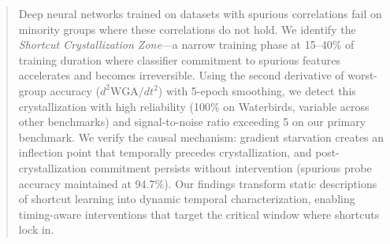 \begin{abstract}
Deep neural networks trained on datasets with spurious correlations fail on minority groups where these correlations do not hold. We identify the \emph{Shortcut Crystallization Zone}---a narrow training phase at 15--40\% of training duration where classifier commitment to spurious features accelerates and becomes irreversible. Using the second derivative of worst-group accuracy ($d^2\text{WGA}/dt^2$) with 5-epoch smoothing, we detect this crystallization with high reliability (100\% on Waterbirds, variable across other benchmarks) and signal-to-noise ratio exceeding 5 on our primary benchmark. We verify the causal mechanism: gradient starvation creates an inflection point that temporally precedes crystallization, and post-crystallization commitment persists without intervention (spurious probe accuracy maintained at 94.7\%). Our findings transform static descriptions of shortcut learning into dynamic temporal characterization, enabling timing-aware interventions that target the critical window where shortcuts lock in.
\end{abstract}
